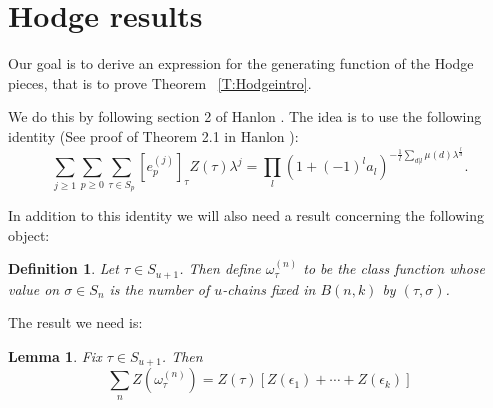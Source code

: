 \documentclass{amsart}
\newtheorem{definition}[theorem]{Definition}
\newtheorem{lemma}[theorem]{Lemma}
\begin{document}
\section{Hodge results}\label{S:Hodge}

Our goal is to derive an expression for the generating function of the Hodge pieces, that is to prove 
Theorem ~\ref{T:Hodgeintro}. 
   
 We do this by following section 2 of Hanlon \cite{Hanlon}. The idea is to use the following identity
(See proof of Theorem 2.1 in Hanlon \cite{Hanlon}):
\begin{equation} \label{E:OldHan}
  \sum_{j \ge 1} \sum_{p \ge 0} \sum_{\tau \in S_p} [e_p^{(j)}]_\tau Z(\tau) \lambda^j = \prod_l (1 + (-1)^l a_l)^
  {-\frac{1}{l} \sum_{d |l} \mu(d) \lambda^{\frac{l}{d}}}.
\end{equation}

In addition to this identity we will also need a result concerning the following object:
\begin{definition} Let $\tau \in S_{u+1}$. Then define $\omega^{(n)}_\tau$ to be the class function whose value on 
$\sigma \in S_n$ is the number of $u$-chains fixed in $B(n, k)$ by $(\tau, \sigma)$. 
\end{definition}

The result we need is:
\begin{lemma} \label{L:mainlemma} Fix $\tau \in S_{u+1}$. Then 
  \begin{equation} \sum_n Z(\omega^{(n)}_\tau) = Z(\tau)[Z(\epsilon_1) + \cdots + Z(\epsilon_k)]
  \end{equation}
\end{lemma}
\end{document}

